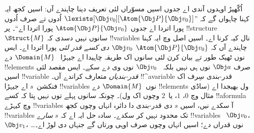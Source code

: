 \documentclass[../../../include/open-logic-section]{subfiles}
\begin{document}
اُکّھیڑ اوہدوں آندی اے جدوں اسیں
مسوّراں لئی تعریف دینا چاہندے آں:
اسیں کجھ ایہ کہنا چاہواں گے کہ
”$\lexists[\Obj
v_0][\Atom{\Obj P}{\Obj v_0}]$
اُدوں تے صرف اُدوں پورا اتردا اے
جدوں $\Atom{\Obj P}{\Obj
v_0}$ پورا اتردا اے“۔
پر !!{structure}~$\Struct{M}$
سانوں نہیں دسدی کہ !!{variable}s
نال کیہ کرنا اے۔ اسیں اصل وچ
ایہ کہنا چاہندے آں کہ
$\Atom{\Obj P}{\Obj v_0}$
\emph{$\Obj v_0$ دی کسے قدر لئی}
پورا اتردا اے۔ ایس نوں ٹھیک طور
تے بیان کرن لئی سانوں اک طریقہ
چاہیدا اے جیہڑا
~$\Domain{M}$ دے !!{element}s
صرف $\Obj a$ نوں ہی نہیں بلکہ
~$\Obj v_0$ نوں وی دے سکے۔
ایس مقصد لئی اسیں !!{variable}
\emph{قدر-بندیاں} متعارف کراندے آں۔
!!^a{variable} قدر-بندی سِرف
اک فنکشن~$s$ اے جیہڑا
!!{variable}s نوں~$\Domain{M}$
دے !!{element}s ول بھیجدا اے
(ساڈی مثال وچ
$0$، $1$، یا~$2$ وچوں اک ول)۔
چونکہ سانوں پہلے توں نہیں پتا
کہ کسے !!a{formula} وچ کیہڑے
!!{variable}s آ سکدے نیں،
اسیں $s$ دی قدر-بندی دا
دائرہ انہاں وچوں کجھ !!{variable}s
تک محدود نہیں کر سکدے۔
سادہ حل ایہ اے کہ $s$
\emph{سارے} !!{variable}s
~$\Obj v_0$، $\Obj v_1$،
\dots\@ نوں قدراں دے؛
اسیں انہاں وچوں صرف اوہی
ورتاں گے جنہاں دی لوڑ اے۔
\end{document}

